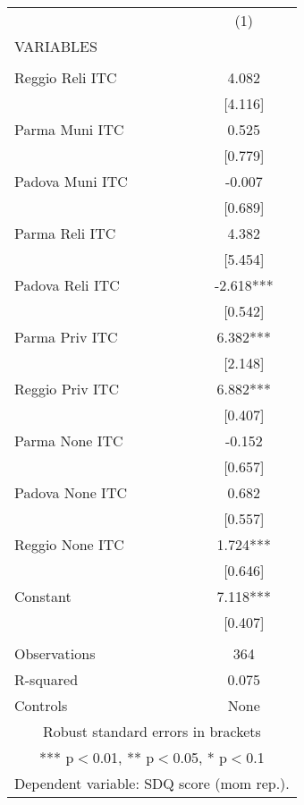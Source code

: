 \begin{tabular}{lc} \hline
 & (1) \\
VARIABLES &  \\ \hline
 &  \\
Reggio Reli ITC & 4.082 \\
 & [4.116] \\
Parma Muni ITC & 0.525 \\
 & [0.779] \\
Padova Muni ITC & -0.007 \\
 & [0.689] \\
Parma Reli ITC & 4.382 \\
 & [5.454] \\
Padova Reli ITC & -2.618*** \\
 & [0.542] \\
Parma Priv ITC & 6.382*** \\
 & [2.148] \\
Reggio Priv ITC & 6.882*** \\
 & [0.407] \\
Parma None ITC & -0.152 \\
 & [0.657] \\
Padova None ITC & 0.682 \\
 & [0.557] \\
Reggio None ITC & 1.724*** \\
 & [0.646] \\
Constant & 7.118*** \\
 & [0.407] \\
 &  \\
Observations & 364 \\
R-squared & 0.075 \\
 Controls & None \\ \hline
\multicolumn{2}{c}{ Robust standard errors in brackets} \\
\multicolumn{2}{c}{ *** p$<$0.01, ** p$<$0.05, * p$<$0.1} \\
\multicolumn{2}{c}{ Dependent variable: SDQ score (mom rep.).} \\
\end{tabular}
